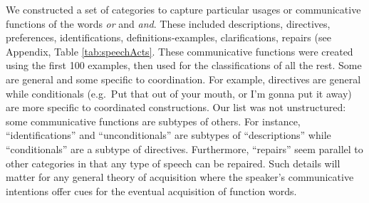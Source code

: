 \documentclass[
  ,man,floatsintext]{apa6}
\begin{document}
We constructed a set of categories to capture particular usages or communicative functions of the words \emph{or} and \emph{and}. These included descriptions, directives, preferences, identifications, definitions-examples, clarifications, repairs (see Appendix, Table \ref{tab:speechActs}. These communicative functions were created using the first 100 examples, then used for the classifications of all the rest. Some are general and some specific to coordination. For example, directives are general while conditionals (e.g.~Put that out of your mouth, or I'm gonna put it away) are more specific to coordinated constructions. Our list was not unstructured: some communicative functions are subtypes of others. For instance, ``identifications'' and ``unconditionals'' are subtypes of ``descriptions'' while ``conditionals'' are a subtype of directives. Furthermore, ``repairs'' seem parallel to other categories in that any type of speech can be repaired. Such details will matter for any general theory of acquisition where the speaker's communicative intentions offer cues for the eventual acquisition of function words.
\end{document}
